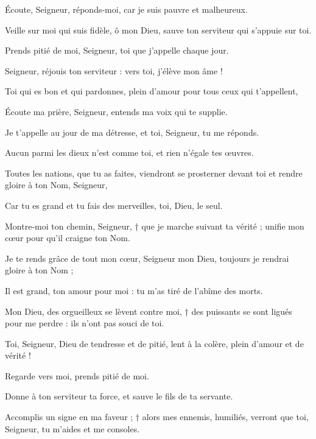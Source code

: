 \item Écoute, Seigneur, réponds-moi, car je suis pauvre et malheureux.
\item Veille sur moi qui suis fidèle, ô mon Dieu, sauve ton serviteur qui s'appuie sur toi.
\item Prends pitié de moi, Seigneur, toi que j'appelle chaque jour.
\item Seigneur, réjouis ton serviteur : vers toi, j'élève mon âme !
\item Toi qui es bon et qui pardonnes, plein d'amour pour tous ceux qui t'appellent,
\item Écoute ma prière, Seigneur, entends ma voix qui te supplie.
\item Je t'appelle au jour de ma détresse, et toi, Seigneur, tu me réponds.
\item Aucun parmi les dieux n'est comme toi, et rien n'égale tes œuvres.
\item Toutes les nations, que tu as faites, viendront se prosterner devant toi et rendre gloire à ton Nom, Seigneur,
\item Car tu es grand et tu fais des merveilles, toi, Dieu, le seul.
\item Montre-moi ton chemin, Seigneur, † que je marche suivant ta vérité ; unifie mon cœur pour qu'il craigne ton Nom.
\item Je te rends grâce de tout mon cœur, Seigneur mon Dieu, toujours je rendrai gloire à ton Nom ;
\item Il est grand, ton amour pour moi : tu m'as tiré de l'abîme des morts.
\item Mon Dieu, des orgueilleux se lèvent contre moi, † des puissants se sont ligués pour me perdre : ils n'ont pas souci de toi.
\item Toi, Seigneur, Dieu de tendresse et de pitié, lent à la colère, plein d'amour et de vérité !
\item Regarde vers moi, prends pitié de moi.
\item Donne à ton serviteur ta force, et sauve le fils de ta servante.
\item Accomplis un signe en ma faveur ; † alors mes ennemis, humiliés, verront que toi, Seigneur, tu m'aides et me consoles.
